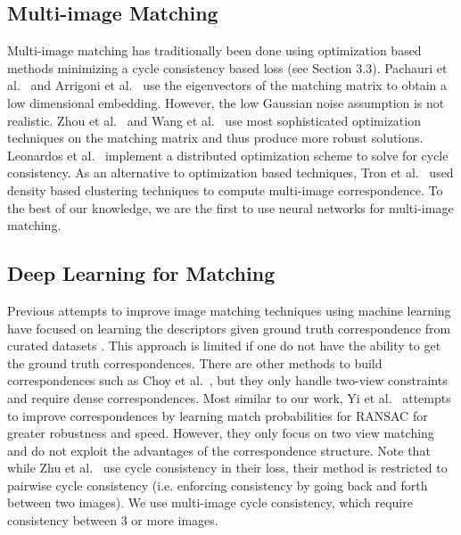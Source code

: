 \documentclass[10pt,twocolumn,letterpaper]{article}
\begin{document}
\subsection{Multi-image Matching}
Multi-image matching has traditionally been done using optimization based methods minimizing a cycle consistency based loss (see Section 3.3).
Pachauri et al.~\cite{pachauri2013solving} and Arrigoni et al.~\cite{arrigoni2017synchronization} use the eigenvectors of the matching matrix to obtain a low dimensional embedding. 
However, the low Gaussian noise assumption is not realistic.
Zhou et al.~\cite{zhou2015multi} and Wang et al.~\cite{wang2017multi} use most sophisticated optimization techniques on the matching matrix and thus produce more robust solutions.
Leonardos et al.~\cite{leonardos2016distributed} implement a distributed optimization scheme to solve for cycle consistency.
As an alternative to optimization based techniques, Tron et al.~\cite{tron2017fast} used density based clustering techniques to compute multi-image correspondence.
To the best of our knowledge, we are the first to use neural networks for multi-image matching.

\subsection{Deep Learning for Matching}
Previous attempts to improve image matching techniques using machine learning have focused on learning the descriptors given ground truth correspondence from curated datasets \cite{zagoruyko2015learning, yi2016lift, brachmann2017dsac}.
This approach is limited if one do not have the ability to get the ground truth correspondences.
There are other methods to build correspondences such as Choy et al.~\cite{choy2016universal}, but they only handle two-view constraints and require dense correspondences.
Most similar to our work, Yi et al.~\cite{yi2018learning} attempts to improve correspondences by learning match probabilities for RANSAC for greater robustness and speed.
However, they only focus on two view matching and do not exploit the advantages of the correspondence structure.
Note that while Zhu et al.~\cite{zhu2017unpaired} use cycle consistency in their loss, their method is restricted to pairwise cycle consistency (i.e. enforcing consistency by going back and forth between two images).
We use multi-image cycle consistency, which require consistency between 3 or more images.
\end{document}
